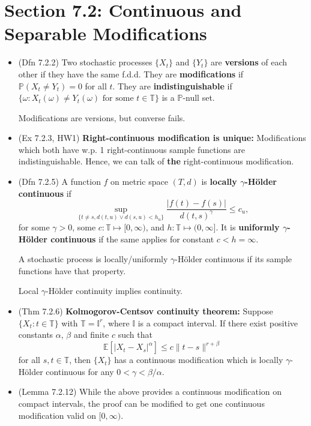 \documentclass[twoside]{article}
\newcommand\bbE{\mathbb{E}}
\newcommand\bbI{\mathbb{I}}
\newcommand\bbP{\mathbb{P}}
\newcommand\bbT{\mathbb{T}}
\newcommand\om{\omega}
\begin{document}
\section*{Section 7.2: Continuous and Separable Modifications}
\begin{itemize}
\item (Dfn 7.2.2) Two stochastic processes $\{X_t\}$ and $\{Y_t\}$ are \textbf{versions} of each other if they have the same f.d.d. They are \textbf{modifications} if $\bbP(X_t \neq Y_t) = 0$ for all $t$. They are \textbf{indistinguishable} if $\{\om: X_t(\om) \neq Y_t(\om) \text{ for some } t \in \bbT \}$ is a $\bbP$-null set.

Modifications are versions, but converse fails.

\item (Ex 7.2.3, HW1) \textbf{Right-continuous modification is unique:} Modifications which both have w.p. 1 right-continuous sample functions are indistinguishable. Hence, we can talk of \textbf{the} right-continuous modification.

\item (Dfn 7.2.5) A function $f$ on metric space $(T, d)$ is \textbf{locally $\gamma$-H\"{o}lder continuous} if
\[ \sup_{\{ t \neq s, d(t, u) \vee d(s, u) < h_u \}} \frac{|f(t) - f(s)|}{d(t,s)^\gamma} \leq c_u, \]
for some $\gamma > 0$, some $c : \bbT \mapsto [0, \infty)$, and $h: \bbT \mapsto (0, \infty]$. It is \textbf{uniformly $\gamma$-H\"{o}lder continuous} if the same applies for constant $c < h = \infty$.

A stochastic process is locally/uniformly $\gamma$-H\"{o}lder continuous if its sample functions have that property.

Local $\gamma$-H\"{o}lder continuity implies continuity.

\item (Thm 7.2.6) \textbf{Kolmogorov-Centsov continuity theorem:} Suppose $\{X_t: t \in \bbT\}$ with $\bbT = \bbI^r$, where $\bbI$ is a compact interval. If there exist positive constants $\alpha$, $\beta$ and finite $c$ such that
\[ \bbE [|X_t - X_s|^\alpha] \leq c\|t-s\|^{r + \beta} \] for all $s, t \in \bbT$, then $\{X_t\}$ has a continuous modification which is locally $\gamma$-H\"{o}lder continuous for any $0 < \gamma < \beta/\alpha$.

\item (Lemma 7.2.12) While the above provides a continuous modification on compact intervals, the proof can be modified to get one continuous modification valid on $[0, \infty)$.


\end{itemize}
\end{document}
